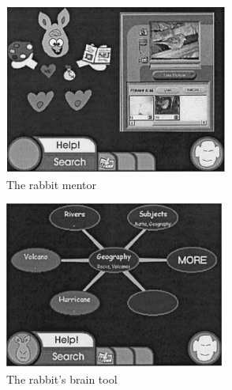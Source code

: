 \begin{figure}[!hbt]\centering
\begin{subfigure}{0.4\textwidth}
\includegraphics[width=\textwidth]{lifelong1}
\caption{The rabbit mentor}
\end{subfigure}\hspace{0.05\textwidth}
\begin{subfigure}{0.4\textwidth}
\includegraphics[width=\textwidth]{lifelong2}
\caption{The rabbit's brain tool}
\end{subfigure}
\begin{subfigure}{0.35\textwidth}

\end{subfigure}
\end{figure}
